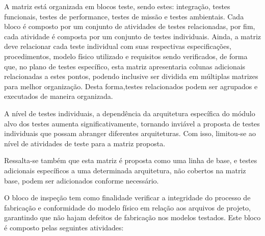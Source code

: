 A matriz está organizada em blocos teste, sendo estes: integração, testes funcionais, testes de performance, testes de missão e testes ambientais.
Cada bloco é composto por um conjunto de atividades de testes relacionadas, por fim, cada atividade é composta por um conjunto de testes individuais.
Ainda, a matriz deve relacionar cada teste individual com suas respectivas especificações, procedimentos, modelo físico utilizado e requisitos sendo verificados, de forma que, no plano de testes específico, esta matriz apresentaria colunas adicionais relacionadas a estes pontos, podendo inclusive ser dividida em múltiplas matrizes para melhor organização.
Desta forma,testes relacionados podem ser agrupados e executados de maneira organizada.

A nível de testes individuais, a dependência da arquitetura específica do módulo alvo dos testes aumenta significativamente, tornando inviável a proposta de testes individuais que possam abranger diferentes arquiteturas.
Com isso, limitou-se ao nível de atividades de teste para a matriz proposta.

Ressalta-se também que esta matriz é proposta como uma linha de base, e testes adicionais específicos a uma determinada arquitetura, não cobertos na matriz base, podem ser adicionados conforme necessário.

O bloco de inspeção tem como finalidade verificar a integridade do processo de fabricação e conformidade do modelo físico em relação aos arquivos de projeto, garantindo que não hajam defeitos de fabricação nos modelos testados.
Este bloco é composto pelas seguintes atividades:

